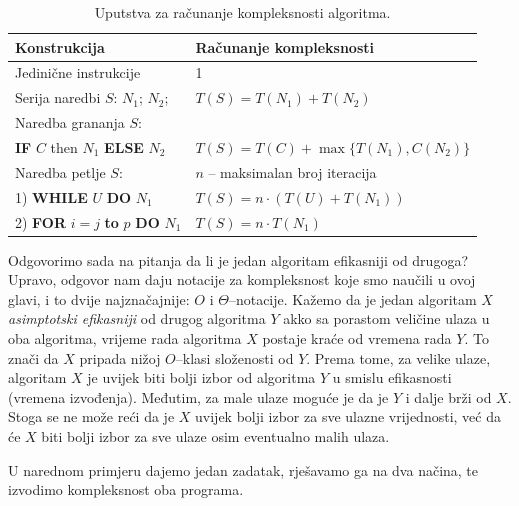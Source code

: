 \begin{table}[H]
		\caption{Uputstva za računanje kompleksnosti algoritma.}  \label{tab:uputstva_racunanje}
	\centering
	\begin{tabular}{l |l} \hline 
		\textbf{Konstrukcija}         & \textbf{Računanje kompleksnosti} \\ \hline
		Jedinične instrukcije         & 1 \\
        Serija naredbi $S$: $N_1$; $N_2$; &  $T(S) = T(N_1) + T(N_2)$  \\ \hline
        Naredba grananja $S$:           &                                \\
        \textbf{IF}  $C$ then $N_1$ \textbf{ELSE} $N_2$  & $T(S) = T(C) + \max\{ T(N_1), C(N_2)\}$  \\          \hline                 
         Naredba petlje $S$:            &   $n$ -- maksimalan broj iteracija          \\
         1) \textbf{WHILE} $U$ \textbf{DO} $N_1$                 &     $T(S)= n \cdot (T(U) + T(N_1))$         \\ 
         2) \textbf{FOR} $i=j$ \textbf{to} $p$ \textbf{DO} $N_1$  &    $T(S)= n\cdot T(N_1)$     \\  \hline
         
	\end{tabular}
\end{table}

Odgovorimo sada na pitanja da li je jedan algoritam efikasniji od drugoga?
Upravo, odgovor nam daju notacije za kompleksnost koje smo naučili u ovoj glavi, i to dvije najznačajnije: $O$ i $\Theta$--notacije. Kažemo da je jedan algoritam $X$ \textit{asimptotski efikasniji} od drugog algoritma  $Y$ akko sa porastom veličine ulaza u oba algoritma, vrijeme rada algoritma $X$ postaje kraće od vremena rada $Y$. To znači da $X$ pripada nižoj $O$--klasi složenosti od $Y$. %
Prema tome, za velike ulaze, algoritam $X$ je uvijek biti bolji izbor od  algoritma $Y$ u smislu efikasnosti (vremena izvođenja). Međutim, za male ulaze moguće je da je $Y$ i dalje brži od $X$. Stoga se ne može reći da je $X$ uvijek bolji izbor za sve ulazne vrijednosti, već da će $X$ biti bolji izbor za sve ulaze osim eventualno malih ulaza.


U narednom primjeru dajemo jedan zadatak, rješavamo ga na dva načina, te izvodimo kompleksnost oba programa.

